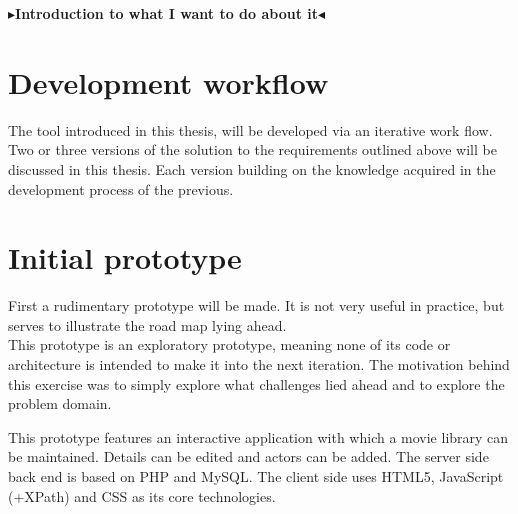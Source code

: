 \documentclass[twoside,11pt,openright]{report}
\newcommand{\todo}[1]{{\color[rgb]{.5,0,0}\textbf{$\blacktriangleright$#1$\blacktriangleleft$}}}
\begin{document}
\todo{Introduction to what I want to do about it}

\section{Development workflow}
The tool introduced in this thesis, will be developed via an iterative
work flow. Two or three versions of the solution to the requirements outlined
above will be discussed in this thesis. Each version building on the knowledge
acquired in the development process of the previous.

\section{Initial prototype}
First a rudimentary prototype will be made. It is not very
useful in practice, but serves to illustrate the road map lying ahead.\\
This prototype is an exploratory prototype, meaning none of its code or
architecture is intended to make it into the next iteration. The motivation
behind this exercise was to simply explore what challenges lied ahead and to
explore the problem domain.

This prototype features an interactive application with which a movie
library can be maintained. Details can be edited and actors can be
added.
The server side back end is based on PHP and MySQL. The client side uses
HTML5, JavaScript (+XPath) and CSS as its core technologies.
\end{document}
